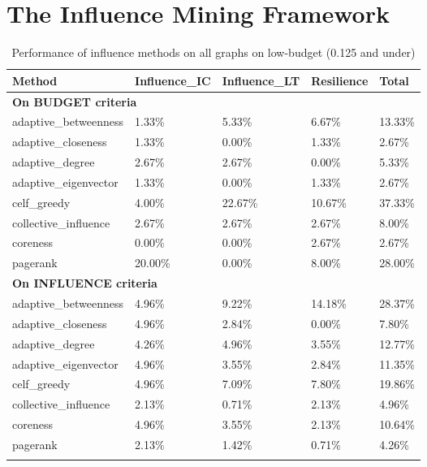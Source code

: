 \section{The Influence Mining Framework}
\label{sec:appendix-B-inf-framework}

\begin{longtable}[c]{|l|l|l|l|l|}
	\hline
	\textbf{Method} & \textbf{Influence\_IC} & \textbf{Influence\_LT} & \textbf{Resilience} & \textbf{Total} \\ \hline
	\endfirsthead
	\endhead
	\multicolumn{5}{|l|}{\textbf{On BUDGET criteria}}             \\ \hline
	adaptive\_betweenness & 1.33\%  & 5.33\%  & 6.67\%  & 13.33\% \\ \hline
	adaptive\_closeness   & 1.33\%  & 0.00\%  & 1.33\%  & 2.67\%  \\ \hline
	adaptive\_degree      & 2.67\%  & 2.67\%  & 0.00\%  & 5.33\%  \\ \hline
	adaptive\_eigenvector & 1.33\%  & 0.00\%  & 1.33\%  & 2.67\%  \\ \hline
	celf\_greedy          & 4.00\%  & 22.67\% & 10.67\% & 37.33\% \\ \hline
	collective\_influence & 2.67\%  & 2.67\%  & 2.67\%  & 8.00\%  \\ \hline
	coreness              & 0.00\%  & 0.00\%  & 2.67\%  & 2.67\%  \\ \hline
	pagerank              & 20.00\% & 0.00\%  & 8.00\%  & 28.00\% \\ \hline
	\multicolumn{5}{|l|}{\textbf{On INFLUENCE criteria}}          \\ \hline
	adaptive\_betweenness & 4.96\%  & 9.22\%  & 14.18\% & 28.37\% \\ \hline
	adaptive\_closeness   & 4.96\%  & 2.84\%  & 0.00\%  & 7.80\%  \\ \hline
	adaptive\_degree      & 4.26\%  & 4.96\%  & 3.55\%  & 12.77\% \\ \hline
	adaptive\_eigenvector & 4.96\%  & 3.55\%  & 2.84\%  & 11.35\% \\ \hline
	celf\_greedy          & 4.96\%  & 7.09\%  & 7.80\%  & 19.86\% \\ \hline
	collective\_influence & 2.13\%  & 0.71\%  & 2.13\%  & 4.96\%  \\ \hline
	coreness              & 4.96\%  & 3.55\%  & 2.13\%  & 10.64\% \\ \hline
	pagerank              & 2.13\%  & 1.42\%  & 0.71\%  & 4.26\%  \\ \hline
	\caption[IMine accuracy of influence methods on low budget]{Performance of influence methods on all graphs on low-budget (0.125 and under)}
	\label{tab:inf-best-min-budget}
\end{longtable}

